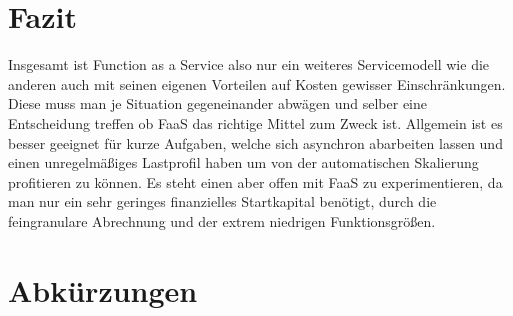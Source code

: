 \documentclass[12pt, a4paper]{article}
\begin{document}
\section{Fazit}
Insgesamt ist Function as a Service also nur ein weiteres Servicemodell wie die anderen auch mit seinen eigenen Vorteilen auf Kosten gewisser Einschränkungen.
Diese muss man je Situation gegeneinander abwägen und selber eine Entscheidung treffen ob \ac{FaaS} das richtige Mittel zum Zweck ist.
Allgemein ist es besser geeignet für kurze Aufgaben, welche sich asynchron abarbeiten lassen und einen unregelmäßiges Lastprofil haben um von der automatischen Skalierung profitieren zu können.
Es steht einen aber offen mit \ac{FaaS} zu experimentieren, da man nur ein sehr geringes finanzielles Startkapital benötigt, durch die feingranulare Abrechnung und der extrem niedrigen Funktionsgrößen.

\newpage

\section{Abkürzungen}
\begin{acronym}
\end{acronym}
\newpage



\end{document}
